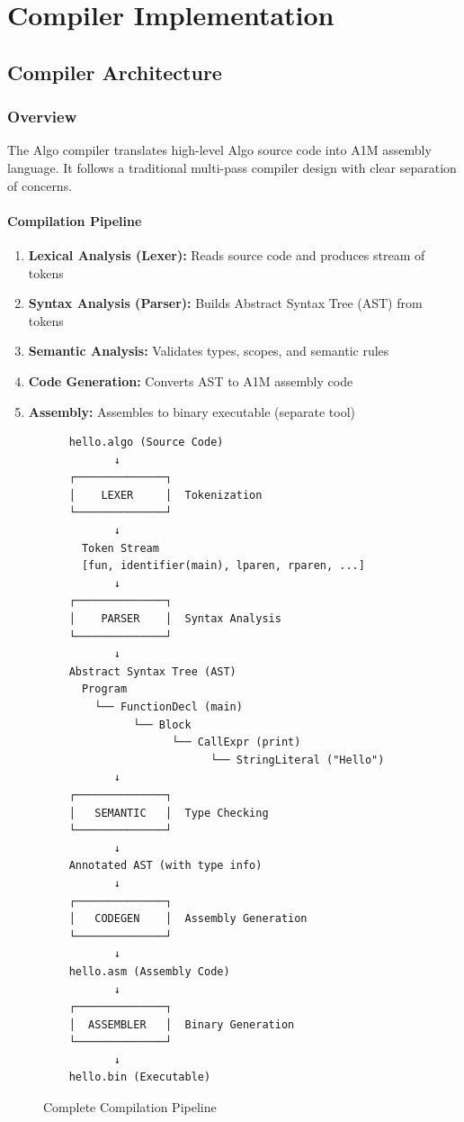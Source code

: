 \documentclass[12pt,a4paper,oneside]{book}
\begin{document}
\part{Compiler Implementation}

\chapter{Compiler Architecture}

\section{Overview}

The Algo compiler translates high-level Algo source code into A1M assembly language. It follows a traditional multi-pass compiler design with clear separation of concerns.

\subsection{Compilation Pipeline}

\begin{enumerate}
    \item \textbf{Lexical Analysis (Lexer):} Reads source code and produces stream of tokens
    \item \textbf{Syntax Analysis (Parser):} Builds Abstract Syntax Tree (AST) from tokens
    \item \textbf{Semantic Analysis:} Validates types, scopes, and semantic rules
    \item \textbf{Code Generation:} Converts AST to A1M assembly code
    \item \textbf{Assembly:} Assembles to binary executable (separate tool)
\end{enumerate}

\begin{figure}[H]
\centering
\begin{verbatim}
    hello.algo (Source Code)
           ↓
    ┌──────────────┐
    │    LEXER     │  Tokenization
    └──────────────┘
           ↓
      Token Stream
      [fun, identifier(main), lparen, rparen, ...]
           ↓
    ┌──────────────┐
    │    PARSER    │  Syntax Analysis
    └──────────────┘
           ↓
    Abstract Syntax Tree (AST)
      Program
        └── FunctionDecl (main)
              └── Block
                    └── CallExpr (print)
                          └── StringLiteral ("Hello")
           ↓
    ┌──────────────┐
    │   SEMANTIC   │  Type Checking
    └──────────────┘
           ↓
    Annotated AST (with type info)
           ↓
    ┌──────────────┐
    │   CODEGEN    │  Assembly Generation
    └──────────────┘
           ↓
    hello.asm (Assembly Code)
           ↓
    ┌──────────────┐
    │  ASSEMBLER   │  Binary Generation
    └──────────────┘
           ↓
    hello.bin (Executable)
\end{verbatim}
\caption{Complete Compilation Pipeline}
\end{figure}
\end{document}
